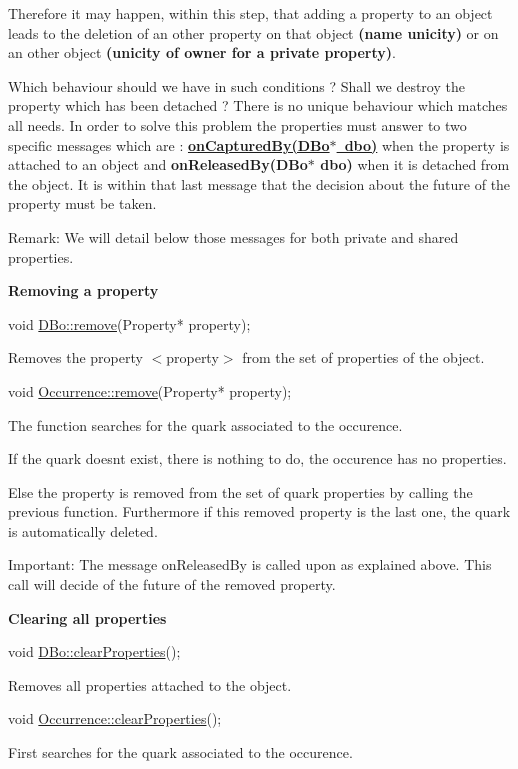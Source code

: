 Therefore it may happen, within this step, that adding a property to an object leads to the deletion of an other property on that object {\bfseries (name unicity)} or on an other object {\bfseries (unicity of owner for a private property)}.

Which behaviour should we have in such conditions ? Shall we destroy the property which has been detached ? There is no unique behaviour which matches all needs. In order to solve this problem the properties must answer to two specific messages which are \+: {\bfseries \mbox{\hyperlink{classHurricane_1_1Property_ac7b936414d9d85bb6509100b5dd6a667}{on\+Captured\+By(\+D\+Bo$\ast$ dbo)}}} when the property is attached to an object and {\bfseries on\+Released\+By(D\+Bo$\ast$ dbo)} when it is detached from the object. It is within that last message that the decision about the future of the property must be taken.

\begin{DoxyParagraph}{Remark\+: We will detail below those messages for both private and }
shared properties.
\end{DoxyParagraph}
{\bfseries Removing a property} 
\begin{DoxyCode}
\textcolor{keywordtype}{void} \mbox{\hyperlink{classHurricane_1_1DBo_a7833a1f0b8c704930bdc00861e63cf5e}{DBo::remove}}(Property* property);
\end{DoxyCode}
 Removes the property {\ttfamily $<$property$>$} from the set of properties of the object. 
\begin{DoxyCode}
\textcolor{keywordtype}{void} \mbox{\hyperlink{classHurricane_1_1Occurrence_a774404aa5eb01371f64cf5fda3f3ffbf}{Occurrence::remove}}(Property* property);
\end{DoxyCode}
 The function searches for the quark associated to the occurence.

If the quark doesn\textquotesingle{}t exist, there is nothing to do, the occurence has no properties.

Else the property is removed from the set of quark properties by calling the previous function. Furthermore if this removed property is the last one, the quark is automatically deleted.

\begin{DoxyParagraph}{Important\+: The message on\+Released\+By is called upon as explained }
above. This call will decide of the future of the removed property.
\end{DoxyParagraph}
{\bfseries Clearing all properties} 
\begin{DoxyCode}
\textcolor{keywordtype}{void} \mbox{\hyperlink{classHurricane_1_1DBo_a3e02f3d665cb0b2120df2fdfe9c3df4f}{DBo::clearProperties}}();
\end{DoxyCode}
 Removes all properties attached to the object. 
\begin{DoxyCode}
\textcolor{keywordtype}{void} \mbox{\hyperlink{classHurricane_1_1Occurrence_ae9b269d39f3f68645d6d396d7ab5d8b7}{Occurrence::clearProperties}}();
\end{DoxyCode}
 First searches for the quark associated to the occurence.


